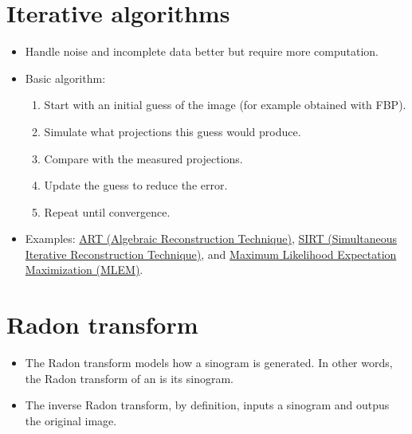 \section{Iterative algorithms}
\begin{itemize}
\item Handle noise and incomplete data better but require more computation.
\item Basic algorithm:
  \begin{enumerate}
  \item Start with an initial guess of the image (for example obtained with FBP).
  \item Simulate what projections this guess would produce.
  \item Compare with the measured projections.
  \item Update the guess to reduce the error.
  \item Repeat until convergence.
  \end{enumerate}
\item Examples:
  \href{https://en.wikipedia.org/wiki/Algebraic_reconstruction_technique}{ART
    (Algebraic Reconstruction Technique)},
  \href{https://tomroelandts.com/articles/the-sirt-algorithm}{SIRT
    (Simultaneous Iterative Reconstruction Technique)}, and
  \href{https://arxiv.org/pdf/1504.06889}{Maximum Likelihood
    Expectation Maximization (MLEM)}.
\end{itemize}

\section{Radon transform}
\begin{itemize}
\item The Radon transform models how a sinogram is generated. In other
  words, the Radon transform of an  is
  its sinogram.
\item The inverse Radon transform, by definition, inputs a sinogram
  and outpus the original image.
\end{itemize}

